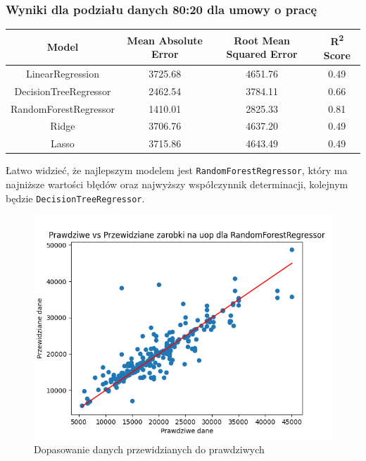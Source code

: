 \documentclass[a4paper]{article}
\begin{document}
\subsubsection{Wyniki dla podziału danych 80:20 dla umowy o pracę}

\begin{table}[H]
    \centering
    \begin{tabular}{|c|c|c|c|}
        \hline
        \textbf{Model}        & \textbf{Mean Absolute Error} & \textbf{Root Mean Squared Error} & \textbf{R\textsuperscript{2} Score} \\ \hline
        LinearRegression      & 3725.68                      & 4651.76                          & 0.49                                \\ \hline
        DecisionTreeRegressor & 2462.54                      & 3784.11                          & 0.66                                \\ \hline
        RandomForestRegressor & 1410.01                      & 2825.33                          & 0.81                                \\ \hline
        Ridge                 & 3706.76                      & 4637.20                          & 0.49                                \\ \hline
        Lasso                 & 3715.86                      & 4643.49                          & 0.49                                \\ \hline
    \end{tabular}
\end{table}


\quad Łatwo widzieć, że najlepszym modelem jest \texttt{RandomForestRegressor}, który ma
najniższe wartości błędów oraz najwyższy współczynnik determinacji, kolejnym
będzie \texttt{DecisionTreeRegressor}.

\begin{figure}[H]
    \centering
    \includegraphics[width=\textwidth]{../analysis/plots/wyniki/0.8&0.2/uop/RandomForestRegressor/scatter.png}
    \caption{Dopasowanie danych przewidzianych do prawdziwych}
\end{figure}
\end{document}
